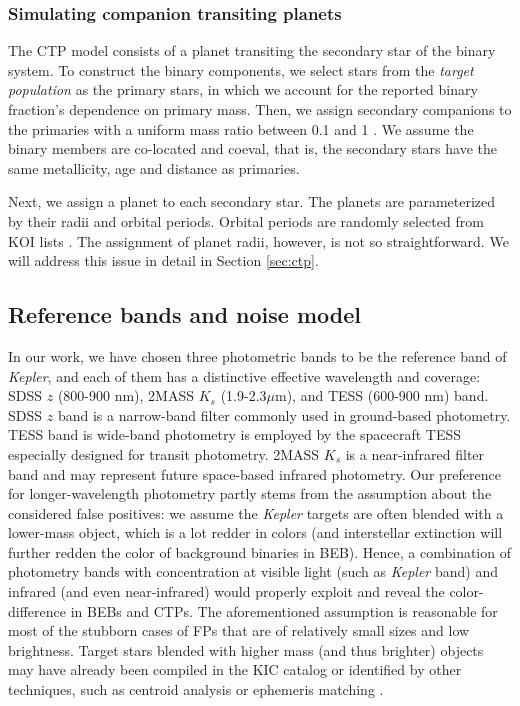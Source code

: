 \documentclass{aastex63}
\begin{document}
    
    \subsubsection{Simulating companion transiting planets}
    \label{sec:ctpsim}
    
    The CTP model consists of a planet transiting the secondary star of the binary system. To construct the binary components, we select stars from the \emph{target population} as the primary stars, in which we account for the reported binary fraction's dependence on primary mass. Then, we assign secondary companions to the primaries with a uniform mass ratio between 0.1 and 1 \citep{Morton2011,Raghavan2010}. We assume the binary members are co-located and coeval, that is, the secondary stars have the same metallicity, age and distance as primaries. 
    
    Next, we assign a planet to each secondary star. The planets are parameterized by their radii and orbital periods. Orbital periods are randomly selected from KOI lists \citep{Batalha2013}. The assignment of planet radii, however, is not so straightforward. We will address this issue in detail in Section \ref{sec:ctp}.


\subsection{Reference bands and noise model}
    \label{sec:noisemodel}

    In our work, we have chosen three photometric bands to be the reference band of \emph{Kepler}, and each of them has a distinctive effective wavelength and coverage: SDSS $z$ (800-900 nm), 2MASS $K_s$ (1.9-2.3$ \mu$m), and TESS (600-900 nm) band. SDSS $z$ band is a narrow-band filter commonly used in ground-based photometry. TESS band is wide-band photometry is employed by the spacecraft TESS especially designed for transit photometry. 2MASS $K_s$ is a near-infrared filter band and may represent future space-based infrared photometry. Our preference for longer-wavelength photometry partly stems from the assumption about the considered false positives: we assume the \emph{Kepler} targets are often blended with a lower-mass object, which is a lot redder in colors (and interstellar extinction will further redden the color of background binaries in BEB). Hence, a combination of photometry bands with concentration at visible light (such as \emph{Kepler} band) and infrared (and even near-infrared) would properly exploit and reveal the color-difference in BEBs and CTPs. The aforementioned assumption is reasonable for most of the stubborn cases of FPs that are of relatively small sizes and low brightness. Target stars blended with higher mass (and thus brighter) objects may have already been compiled in the KIC catalog or identified by other techniques, such as centroid analysis \citep{Bryson2013} or ephemeris matching \citep{Coughlin2014}.
    
\end{document}
